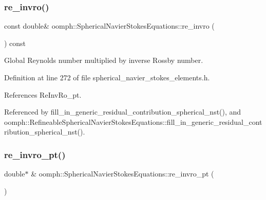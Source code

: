 \mbox{\label{classoomph_1_1SphericalNavierStokesEquations_a4a9bb055e3ea5f00d1edee5efcad4937}} 
\subsubsection{\texorpdfstring{re\+\_\+invro()}{re\_invro()}}
{\footnotesize\ttfamily const double\& oomph\+::\+Spherical\+Navier\+Stokes\+Equations\+::re\+\_\+invro (\begin{DoxyParamCaption}{ }\end{DoxyParamCaption}) const\hspace{0.3cm}{\ttfamily [inline]}}



Global Reynolds number multiplied by inverse Rossby number. 



Definition at line 272 of file spherical\+\_\+navier\+\_\+stokes\+\_\+elements.\+h.



References Re\+Inv\+Ro\+\_\+pt.



Referenced by fill\+\_\+in\+\_\+generic\+\_\+residual\+\_\+contribution\+\_\+spherical\+\_\+nst(), and oomph\+::\+Refineable\+Spherical\+Navier\+Stokes\+Equations\+::fill\+\_\+in\+\_\+generic\+\_\+residual\+\_\+contribution\+\_\+spherical\+\_\+nst().

\mbox{\label{classoomph_1_1SphericalNavierStokesEquations_a90f9fc0e4ed20ad28395e838106dc97d}} 
\subsubsection{\texorpdfstring{re\+\_\+invro\+\_\+pt()}{re\_invro\_pt()}}
{\footnotesize\ttfamily double$\ast$ \& oomph\+::\+Spherical\+Navier\+Stokes\+Equations\+::re\+\_\+invro\+\_\+pt (\begin{DoxyParamCaption}{ }\end{DoxyParamCaption})\hspace{0.3cm}{\ttfamily [inline]}}



